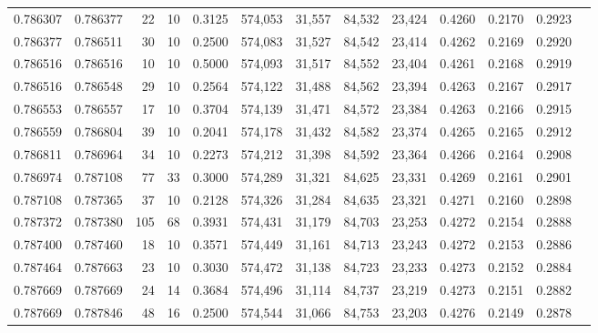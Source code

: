 \begin{tabular}{rrrrrrrrrrrrr}
0.786307 & 0.786377 &    22 &  10 &                                     0.3125 & 574,053 &  31,557 &  84,532 &  23,424 & 0.4260 & 0.2170 & 0.2923 \\
0.786377 & 0.786511 &    30 &  10 &                                     0.2500 & 574,083 &  31,527 &  84,542 &  23,414 & 0.4262 & 0.2169 & 0.2920 \\
0.786516 & 0.786516 &    10 &  10 &                                     0.5000 & 574,093 &  31,517 &  84,552 &  23,404 & 0.4261 & 0.2168 & 0.2919 \\
0.786516 & 0.786548 &    29 &  10 &                                     0.2564 & 574,122 &  31,488 &  84,562 &  23,394 & 0.4263 & 0.2167 & 0.2917 \\
0.786553 & 0.786557 &    17 &  10 &                                     0.3704 & 574,139 &  31,471 &  84,572 &  23,384 & 0.4263 & 0.2166 & 0.2915 \\
0.786559 & 0.786804 &    39 &  10 &                                     0.2041 & 574,178 &  31,432 &  84,582 &  23,374 & 0.4265 & 0.2165 & 0.2912 \\
0.786811 & 0.786964 &    34 &  10 &                                     0.2273 & 574,212 &  31,398 &  84,592 &  23,364 & 0.4266 & 0.2164 & 0.2908 \\
0.786974 & 0.787108 &    77 &  33 &                                     0.3000 & 574,289 &  31,321 &  84,625 &  23,331 & 0.4269 & 0.2161 & 0.2901 \\
0.787108 & 0.787365 &    37 &  10 &                                     0.2128 & 574,326 &  31,284 &  84,635 &  23,321 & 0.4271 & 0.2160 & 0.2898 \\
0.787372 & 0.787380 &   105 &  68 &                                     0.3931 & 574,431 &  31,179 &  84,703 &  23,253 & 0.4272 & 0.2154 & 0.2888 \\
0.787400 & 0.787460 &    18 &  10 &                                     0.3571 & 574,449 &  31,161 &  84,713 &  23,243 & 0.4272 & 0.2153 & 0.2886 \\
0.787464 & 0.787663 &    23 &  10 &                                     0.3030 & 574,472 &  31,138 &  84,723 &  23,233 & 0.4273 & 0.2152 & 0.2884 \\
0.787669 & 0.787669 &    24 &  14 &                                     0.3684 & 574,496 &  31,114 &  84,737 &  23,219 & 0.4273 & 0.2151 & 0.2882 \\
0.787669 & 0.787846 &    48 &  16 &                                     0.2500 & 574,544 &  31,066 &  84,753 &  23,203 & 0.4276 & 0.2149 & 0.2878 \\

\end{tabular}
